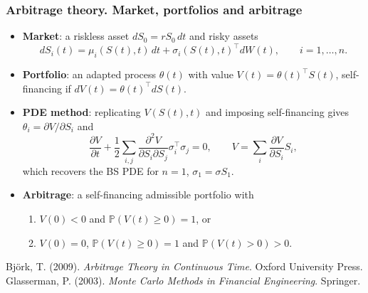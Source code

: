
\begin{frame}
\frametitle{Arbitrage theory. Market, portfolios and arbitrage}
\begin{scriptsize}
\begin{itemize}
\item \textbf{Market}: a riskless asset $dS_0 = r S_0\, dt$ and risky assets
\begin{equation*}
    dS_i(t) = \mu_i(S(t), t)\, dt + \sigma_i(S(t), t)^\intercal dW(t), \qquad i = 1, \dots, n .
\end{equation*}
\item \textbf{Portfolio}: an adapted process $\theta(t)$ with value $V(t) = \theta(t)^\intercal S(t)$,
self-financing if $dV(t) = \theta(t)^\intercal dS(t)$.

\item \textbf{PDE method}: replicating $V(S(t), t)$ and imposing self-financing gives
$\theta_i = \partial V / \partial S_i$ and
\begin{equation*}
    \frac{\partial V}{\partial t} + \frac{1}{2} \sum_{i,j} \frac{\partial^2 V}{\partial S_i \partial S_j} \sigma_i^\intercal \sigma_j = 0,
    \qquad V = \sum_{i} \frac{\partial V}{\partial S_i} S_i,
\end{equation*}
which recovers the BS PDE for $n = 1$, $\sigma_1 = \sigma S_1$.

\item \textbf{Arbitrage}: a self-financing admissible portfolio with
\begin{enumerate}
\item $V(0) < 0$ and $\mathbb{P}(V(t) \geq 0) = 1$, or
\item $V(0) = 0$, $\mathbb{P}(V(t) \geq 0) = 1$ and $\mathbb{P}(V(t) > 0) > 0$.
\end{enumerate}
\end{itemize}
\smallskip
Bj\"ork, T. (2009). \emph{Arbitrage Theory in Continuous Time}. Oxford University Press.\\
Glasserman, P. (2003). \emph{Monte Carlo Methods in Financial Engineering}. Springer.
\end{scriptsize}
\end{frame}

